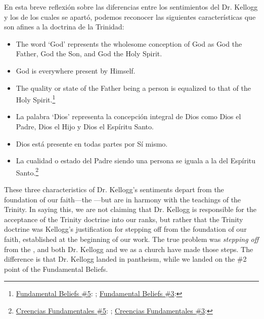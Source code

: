 En esta breve reflexión sobre las diferencias entre los sentimientos del Dr. Kellogg y los  de los cuales se apartó, podemos reconocer las siguientes características que son afines a la doctrina de la Trinidad:


\begin{itemize}
    \item The word ‘God’ represents the wholesome conception of God as God the Father, God the Son, and God the Holy Spirit.
    \item God is everywhere present by Himself.
    \item The quality or state of the Father being a person is equalized to that of the Holy Spirit.\footnote{\href{https://www.adventist.org/wp-content/uploads/2020/06/ADV-28Beliefs2020.pdf}{Fundamental Beliefs \#5}: ; \href{https://www.adventist.org/wp-content/uploads/2020/06/ADV-28Beliefs2020.pdf}{Fundamental Beliefs \#3}: }
\end{itemize}


\begin{itemize}
    \item La palabra ‘Dios’ representa la concepción integral de Dios como Dios el Padre, Dios el Hijo y Dios el Espíritu Santo.
    \item Dios está presente en todas partes por Sí mismo.
    \item La cualidad o estado del Padre siendo una persona se iguala a la del Espíritu Santo.\footnote{\href{https://www.adventist.org/wp-content/uploads/2020/06/ADV-28Beliefs2020.pdf}{Creencias Fundamentales \#5}: ; \href{https://www.adventist.org/wp-content/uploads/2020/06/ADV-28Beliefs2020.pdf}{Creencias Fundamentales \#3}: }
\end{itemize}


These three characteristics of Dr. Kellogg's sentiments depart from the foundation of our faith—the —but are in harmony with the teachings of the Trinity. In saying this, we are not claiming that Dr. Kellogg is responsible for the acceptance of the Trinity doctrine into our ranks, but rather that the Trinity doctrine was Kellogg's justification for stepping off from the foundation of our faith, established at the beginning of our work. The true problem was \textit{stepping off} from the , and both Dr. Kellogg and we as a church have made those steps. The difference is that Dr. Kellogg landed in pantheism, while we landed on the \#2 point of the Fundamental Beliefs.


